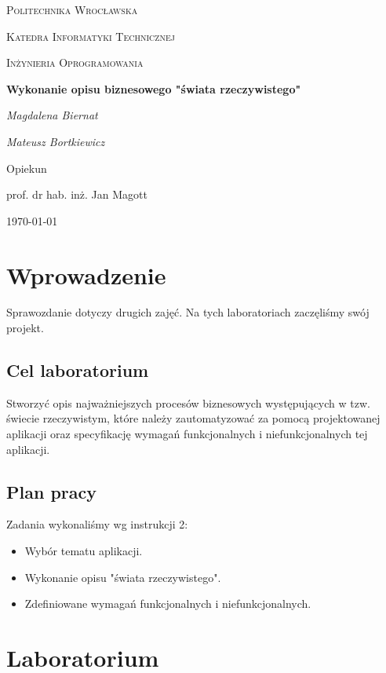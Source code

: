 \documentclass{article}
\begin{document}
\begin{titlepage}
\centering
{\scshape\LARGE Politechnika Wrocławska \par}
{\scshape\Large Katedra Informatyki Technicznej\par}

	\vspace{1cm}
	{\scshape\Large Inżynieria Oprogramowania\par}
	\vspace{1.5cm}
	{\huge\bfseries Wykonanie opisu biznesowego "świata rzeczywistego"\par}
	\vspace{2cm}
	{\Large\itshape Magdalena Biernat\par}
	{\Large\itshape Mateusz Bortkiewicz\par}
	\vfill
	Opiekun\par
	prof. dr hab. inż. Jan Magott 

	\vfill
	{\large \today\par}
\end{titlepage}
\newpage

\section{Wprowadzenie}
Sprawozdanie dotyczy drugich zajęć. Na tych laboratoriach zaczęliśmy swój projekt. 

\subsection{Cel laboratorium}
Stworzyć opis najważniejszych procesów biznesowych występujących w tzw. świecie rzeczywistym, które należy zautomatyzować za pomocą projektowanej aplikacji oraz specyfikację wymagań funkcjonalnych i niefunkcjonalnych tej aplikacji.

\subsection{Plan pracy}
Zadania wykonaliśmy wg instrukcji 2:
\begin{itemize}
\item Wybór tematu aplikacji.
\item Wykonanie opisu "świata rzeczywistego".
\item Zdefiniowane wymagań funkcjonalnych i niefunkcjonalnych. 
\end{itemize}
\section{Laboratorium}
\end{document}
